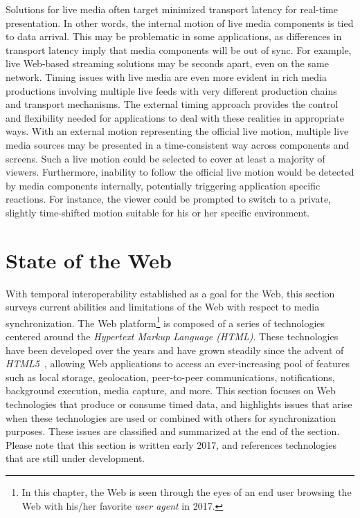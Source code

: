 \documentclass[graybox]{svmult}
\begin{document}
Solutions for live media often target minimized transport latency for real-time 
presentation. In other words, the internal motion of live media
components is tied to data arrival. This may be problematic in some
applications, as differences in transport latency imply that media components
will be out of sync. For example, live Web-based streaming solutions may be
seconds apart, even on the same network. Timing issues with live media are even
more evident in rich media productions involving multiple live feeds with very
different production chains and transport mechanisms. The external timing
approach provides the control and flexibility needed for applications to deal
with these realities in appropriate ways. With an external motion representing
the official live motion, multiple live media sources may be presented in a
time-consistent way across components and screens. Such a live motion could be
selected to cover at least a majority of viewers. Furthermore, inability to
follow the official live motion would be detected by media components
internally, potentially triggering application specific reactions. For
instance, the viewer could be prompted to switch to a private, slightly time-shifted 
motion suitable for his or her specific environment.



\section{State of the Web}
\label{sec:web}
With temporal interoperability established as a goal for the Web, this section
surveys current abilities and limitations of the Web with respect to
media synchronization. The Web platform\footnote{In this chapter, the Web is
seen through the eyes of an end user browsing the Web with his/her favorite
\emph{user agent} in 2017.} is composed of a series of technologies centered
around the \emph{Hypertext Markup Language (HTML)}. These technologies have
been developed over the years and have grown steadily since the advent of
\emph{HTML5}~\cite{html5}, allowing Web applications to access an  ever-increasing 
pool of features such as local storage, geo{\-}location, peer-to-peer
communications, notifications, background execution, media capture, and more.
This section focuses on Web technologies that produce or
consume timed data, and highlights issues that arise when these technologies
are used or combined with others for synchronization purposes. These issues
are classified and summarized at the end of the section. Please note that this
section is written early 2017, and references technologies that are still under
development.
\end{document}

